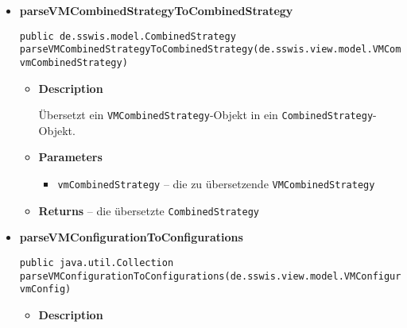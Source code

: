 {{{{{{{\begin{itemize}
{\begin{itemize}
{Übersetzt das \texttt{\small Simulation}-Objekt einer abgeschlossenen Simulation in ein \texttt{\small VMResult}-Objekt. Dabei werden die Daten der Simulation in ein für die Ergebnisansicht konformes Format konvertiert.
}
\item{
{\bf  Parameters}
  \begin{itemize}
   \item{
\texttt{simulation} -- die abgeschlossene Simulation}
  \end{itemize}
}%
\item{{\bf  Returns} -- 
die für die Ergebnisansicht aufbereiteten Ergebnisse 
}%
\end{itemize}
}%
\item{ 
\hypertarget{de.sswis.controller.ModelParser.parseVMCombinedStrategyToCombinedStrategy(de.sswis.view.model.VMCombinedStrategy)}{{\bf  parseVMCombinedStrategyToCombinedStrategy}\\}
\begin{lstlisting}[frame=none]
public de.sswis.model.CombinedStrategy parseVMCombinedStrategyToCombinedStrategy(de.sswis.view.model.VMCombinedStrategy vmCombinedStrategy)\end{lstlisting} %
\begin{itemize}
\item{
{\bf  Description}

Übersetzt ein \texttt{\small VMCombinedStrategy}-Objekt in ein \texttt{\small CombinedStrategy}-Objekt.
}
\item{
{\bf  Parameters}
  \begin{itemize}
   \item{
\texttt{vmCombinedStrategy} -- die zu übersetzende \texttt{\small VMCombinedStrategy}}
  \end{itemize}
}%
\item{{\bf  Returns} -- 
die übersetzte \texttt{\small CombinedStrategy} 
}%
\end{itemize}
}%
\item{ 
\hypertarget{de.sswis.controller.ModelParser.parseVMConfigurationToConfigurations(de.sswis.view.model.VMConfiguration)}{{\bf  parseVMConfigurationToConfigurations}\\}
\begin{lstlisting}[frame=none]
public java.util.Collection parseVMConfigurationToConfigurations(de.sswis.view.model.VMConfiguration vmConfig)\end{lstlisting} %
\begin{itemize}
\item{
{\bf  Description}

}
\end{itemize}}
\end{itemize}}}}}}}}
